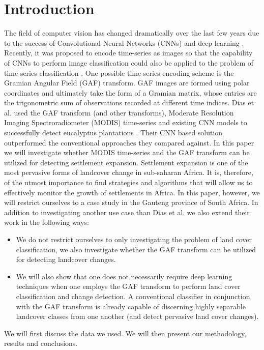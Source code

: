 \documentclass{article}
\begin{document}
\section{Introduction}
\label{sec:intro}
The field of computer vision has changed dramatically over the last few years due to the success of Convolutional Neural Networks (CNNs) and deep learning \cite{goodfellow2016}.  Recently, it was proposed to encode time-series as images so that the capability of CNNs to perform image classification could also be applied to the problem of time-series classification \cite{wang2015}. One possible time-series encoding scheme is the Gramian Angular Field (GAF) transform. GAF images are formed using polar coordinates and ultimately take the form of a Gramian matrix, whose entries are the trigonometric sum of observations recorded at different time indices.  Dias et al. used the GAF transform (and other transforms), Moderate Resolution Imaging Spectroradiometer (MODIS) time-series and existing CNN models to successfully detect eucalyptus plantations \cite{dias2019}. Their CNN based solution outperformed the conventional approaches they compared against. In this paper we will investigate whether MODIS time-series and the GAF transform can be utilized for detecting settlement expansion. Settlement expansion is one of the most pervasive forms of landcover change in sub-saharan Africa. It is, therefore, of the utmost importance to find strategies and algorithms that will allow us to effectively monitor the growth of settlements in Africa. In this paper, however, we will restrict ourselves to a case study in the Gauteng province of South Africa. In addition to investigating another use case than Dias et al. we also extend their work in the following ways:
\begin{itemize}
 \item We do not restrict ourselves to only investigating the problem of land cover classification, we also investigate whether the GAF transform can be utilized for detecting landcover changes.
 \item We will also show that one does not necessarily require deep learning techniques when one employs the GAF transform to perform land cover classification and change detection. A conventional classifier in conjunction with the GAF transform is already capable of discerning highly separable landcover classes from one another (and detect pervasive land cover changes).
\end{itemize}
We will first discuss the data we used. We will then present our methodology, results and conclusions.
\end{document}
